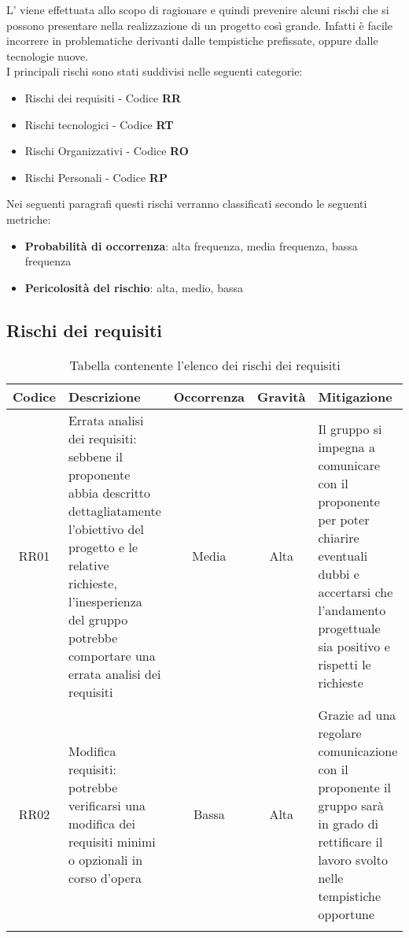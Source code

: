 \documentclass[../piano_di_progetto.tex]{subfiles}
\begin{document}
L’  viene effettuata allo scopo di ragionare e quindi prevenire alcuni rischi che si possono presentare nella realizzazione di un progetto così grande. Infatti è facile incorrere in problematiche derivanti dalle tempistiche prefissate, oppure dalle tecnologie nuove.\\
I principali rischi sono stati suddivisi nelle seguenti categorie:
\begin{itemize}
	\item Rischi dei requisiti - Codice \textbf{RR}
	\item Rischi tecnologici  - Codice \textbf{RT}
	\item Rischi Organizzativi - Codice \textbf{RO}
	\item Rischi Personali - Codice \textbf{RP}
\end{itemize}
Nei seguenti paragrafi questi rischi verranno classificati secondo le seguenti metriche:
\begin{itemize}
	\item \textbf{Probabilità di occorrenza}: alta frequenza, media frequenza, bassa frequenza
	\item \textbf{Pericolosità del rischio}: alta, medio, bassa
\end{itemize}

\subsection{Rischi dei requisiti}%
\label{sub:rischi_req}

\begin{center}
	\begin{longtable}{|c|p{4.5cm}|c|c|p{4.5cm}|}
		\hline
		\rowcolor{lightgray}
		{\textbf{Codice}} & {\textbf{Descrizione}} & {\textbf{Occorrenza}} & {\textbf{Gravità}} & {\textbf{Mitigazione}}                                                     \\

		\hline
		RR01              &
		Errata analisi dei requisiti: sebbene il proponente abbia descritto dettagliatamente l’obiettivo del progetto e le relative richieste, l’inesperienza del gruppo potrebbe comportare una errata analisi dei requisiti
		                  &
		Media
		                  &
		Alta
		                  &
		Il gruppo si impegna a comunicare con il proponente per poter chiarire eventuali dubbi e accertarsi che l’andamento progettuale sia positivo e rispetti le richieste \\

		RR02              &
		Modifica requisiti: potrebbe verificarsi una modifica dei requisiti minimi o opzionali in corso d’opera
		                  &
		Bassa
		                  &
		Alta
		                  &
		Grazie ad una regolare comunicazione con il proponente il gruppo sarà in grado di rettificare il lavoro svolto nelle tempistiche opportune                           \\
		\hline
		\rowcolor{white}
		\caption{Tabella contenente l'elenco dei rischi dei requisiti}
	\end{longtable}

\end{center}
\end{document}
